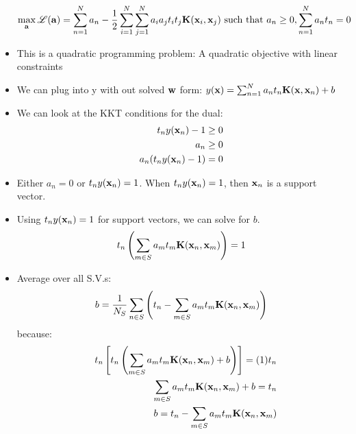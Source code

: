 \documentclass[12pt,letterpaper]{article}
\begin{document}
\begin{itemize}
\begin{equation}
\max_{\mathbf{a}} \mathscr{L}(\mathbf{a}) = \sum_{n=1}^N a_n - \frac{1}{2} \sum_{i=1}^N\sum_{j=1}^N a_i a_j t_i t_j \mathbf{K}(\mathbf{x}_i,\mathbf{x}_j) \text{ such that } a_n \ge 0, \sum_{n=1}^N a_nt_n = 0
\end{equation}
\item This is a quadratic programming problem:  A quadratic objective with linear constraints
\item We can plug into y with out solved $\mathbf{w}$ form: $y(\mathbf{x}) = \sum_{n=1}^N a_nt_n\mathbf{K}(\mathbf{x},\mathbf{x}_n) + b$
\item We can look at the KKT conditions for the dual:
\begin{eqnarray}
t_ny(\mathbf{x}_n) -1 \ge 0\\
a_n \ge 0\\
a_n (t_ny(\mathbf{x}_n) -1 ) = 0
\end{eqnarray}
\item Either $a_n =0$ or $t_ny(\mathbf{x}_n) = 1$.  When $t_ny(\mathbf{x}_n) = 1$, then $\mathbf{x}_n$ is a support vector. 
\item Using $t_ny(\mathbf{x}_n) =1$ for support vectors, we can solve for $b$.
\begin{equation}
t_n\left( \sum_{m \in S} a_mt_m\mathbf{K}(\mathbf{x}_n, \mathbf{x}_m) \right) = 1
\end{equation}
\item Average over all S.V.s: 
\begin{equation}
b = \frac{1}{N_S} \sum_{n\in S} \left( t_n - \sum_{m \in S} a_mt_m\mathbf{K}(\mathbf{x}_n, \mathbf{x}_m) \right) 
\end{equation}
 because:
\begin{eqnarray}
& & t_n\left[t_n\left( \sum_{m \in S} a_mt_m\mathbf{K}(\mathbf{x}_n, \mathbf{x}_m) + b\right)\right] = (1)t_n\\
& &  \sum_{m \in S} a_mt_m\mathbf{K}(\mathbf{x}_n, \mathbf{x}_m) + b = t_n\\
& & b = t_n -  \sum_{m \in S} a_mt_m\mathbf{K}(\mathbf{x}_n, \mathbf{x}_m)
\end{eqnarray}
\end{itemize}
\end{document}
